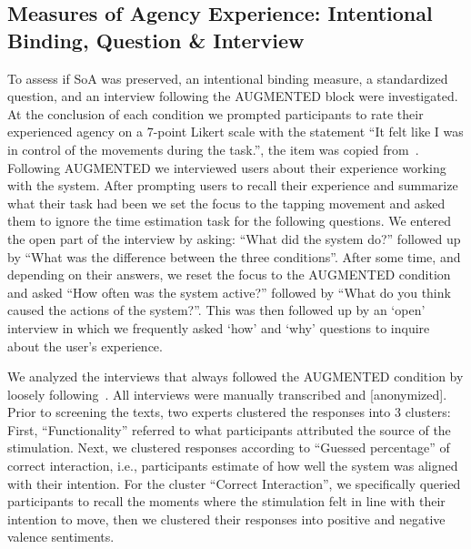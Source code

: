 
\subsection{Measures of Agency Experience: Intentional Binding, Question \& Interview}
To assess if SoA was preserved, an intentional binding measure, a standardized question, and an interview following the AUGMENTED block were investigated. At the conclusion of each condition we prompted participants to rate their experienced agency on a 7-point Likert scale with the statement ``It felt like I was in control of the movements during the task.'', the item was copied from~\cite{Bergstrom2022-fb}. Following AUGMENTED we interviewed users about their experience working with the system. After prompting users to recall their experience and summarize what their task had been we set the focus to the tapping movement and asked them to ignore the time estimation task for the following questions. We entered the open part of the interview by asking: ``What did the system do?'' followed up by ``What was the difference between the three conditions''. After some time, and depending on their answers, we reset the focus to the AUGMENTED condition and asked ``How often was the system active?'' followed by ``What do you think caused the actions of the system?''. This was then followed up by an `open' interview in which we frequently asked `how' and `why' questions to inquire about the user's experience.

We analyzed the interviews that always followed the AUGMENTED condition by loosely following~\citet{Mayring2015-pp}. All interviews were manually transcribed and [anonymized]. Prior to screening the texts, two experts clustered the responses into 3 clusters: First, ``Functionality'' referred to what participants attributed the source of the stimulation. Next, we clustered responses according to ``Guessed percentage'' of correct interaction, i.e., participants estimate of how well the system was aligned with their intention. For the cluster ``Correct Interaction'', we specifically queried participants to recall the moments where the stimulation felt in line with their intention to move, then we clustered their responses into positive and negative valence sentiments. 

